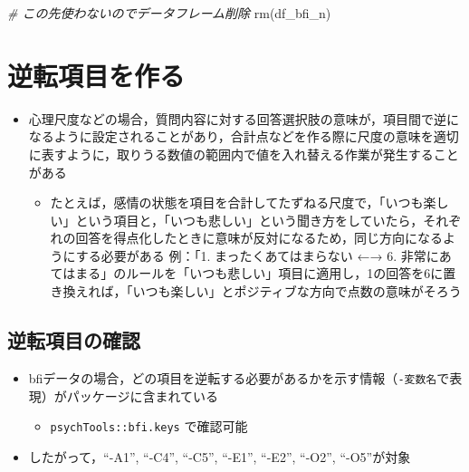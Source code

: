 \documentclass[
  xelatex,ja=standard, b5paper]{bxjsbook}
\newenvironment{Shaded}{\begin{snugshade}}{\end{snugshade}}
\newcommand{\CommentTok}[1]{\textcolor[rgb]{0.56,0.35,0.01}{\textit{#1}}}
\newcommand{\FunctionTok}[1]{\textcolor[rgb]{0.00,0.00,0.00}{#1}}
\newcommand{\NormalTok}[1]{#1}
\providecommand{\tightlist}{%
  \setlength{\itemsep}{0pt}\setlength{\parskip}{0pt}}
\begin{document}
\begin{Shaded}
\begin{Highlighting}[]
\CommentTok{\# この先使わないのでデータフレーム削除}
\FunctionTok{rm}\NormalTok{(df\_bfi\_n)}
\end{Highlighting}
\end{Shaded}

\hypertarget{mu-rev}{%
\section{逆転項目を作る}\label{mu-rev}}

\begin{itemize}
\tightlist
\item
  心理尺度などの場合，質問内容に対する回答選択肢の意味が，項目間で逆になるように設定されることがあり，合計点などを作る際に尺度の意味を適切に表すように，取りうる数値の範囲内で値を入れ替える作業が発生することがある

  \begin{itemize}
  \tightlist
  \item
    たとえば，感情の状態を項目を合計してたずねる尺度で，「いつも楽しい」という項目と，「いつも悲しい」という聞き方をしていたら，それぞれの回答を得点化したときに意味が反対になるため，同じ方向になるようにする必要がある
    例：「1. まったくあてはまらない ←→ 6. 非常にあてはまる」のルールを「いつも悲しい」項目に適用し，1の回答を6に置き換えれば，「いつも楽しい」とポジティブな方向で点数の意味がそろう
  \end{itemize}
\end{itemize}

\hypertarget{mu-rev-check}{%
\subsection{逆転項目の確認}\label{mu-rev-check}}

\begin{itemize}
\tightlist
\item
  bfiデータの場合，どの項目を逆転する必要があるかを示す情報（\texttt{-変数名}で表現）がパッケージに含まれている

  \begin{itemize}
  \tightlist
  \item
    \texttt{psychTools::bfi.keys} で確認可能
  \end{itemize}
\item
  したがって，``-A1'', ``-C4'', ``-C5'', ``-E1'', ``-E2'', ``-O2'', ``-O5''が対象
\end{itemize}
\end{document}

